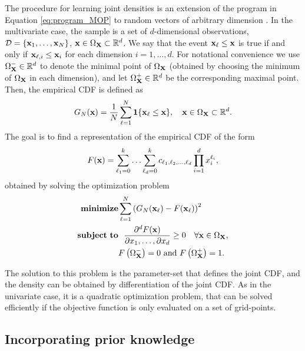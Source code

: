 The procedure for learning joint densities is an extension of the  program in Equation \ref{eq:program_MOP} to random vectors of
arbitrary dimension \citep{Per15b}. 
In the multivariate case, the sample is a set of $d$-dimensional observations, 
${\cal D}=\{ \mathbf{x}_1,\ldots,\mathbf{x}_N \}$, $\mathbf{x}\in\Omega_{\mathbf{X}}\subset\mathbb{R}^d$. 
We say that the event $\mathbf{x}_\ell \leq \mathbf{x}$ is true if and only if $\mathbf{x}_{\ell,i} \leq \mathbf{x}_i$ for each dimension $i=1,\ldots, d$.
For notational convenience we use $\Omega_{\mathbf{X}}^-\in\mathbb{R}^d$ to denote the minimal point of $\Omega_{\mathbf{X}}$ (obtained by choosing the minimum of $\Omega_{\mathbf{X}}$ in each dimension), and let $\Omega_{\mathbf{X}}^+\in\mathbb{R}^d$ be the corresponding  maximal point. Then, the empirical CDF is defined as
\begin{equation}
\nonumber
G_N(\mathbf{x}) = \frac{1}{N} \sum_{\ell=1}^N  \mathbf{1}\{ \mathbf{x}_\ell\leq \mathbf{x}\}, \quad \mathbf{x} \in  \Omega_{\mathbf{X}}\subset\mathbb{R}^d.
\end{equation}
The goal is to find a representation of the empirical CDF of the form 
$$F(\mathbf{x})=\sum_{\ell_1=0}^k \ldots \sum_{\ell_d=0}^k c_{\ell_1,\ell_2,\ldots,\ell_d} \prod_{i=1}^d x_i^{\ell_i},$$
obtained by solving the optimization problem
\begin{align}
\mathbf{minimize} & \displaystyle  \sum_{\ell=1}^N \left(G_N(\mathbf{x}_\ell) - F(\mathbf{x}_\ell)\right) ^2  \notag  \\
\mathbf{subject~to} & ~~\displaystyle \frac{\partial^d F(\mathbf{x})}
{\partial x_1, \dots, \partial x_d} \geq 0  \quad \forall \mathbf{x} \in \Omega_{\mathbf{X}},\label{eq:jointN_MOP}\\
& 
\displaystyle F\left(\Omega_{\mathbf{X}}^-\right) =0 \notag  \text{ and }    \notag  \displaystyle F\left(\Omega_{\mathbf{X}}^+\right) =1.  \notag
\end{align}


The solution to this problem is the parameter-set that defines the joint CDF, and the density can be obtained 
by differentiation of the joint CDF.  As in the univariate case, it is a quadratic optimization problem, 
that can be solved efficiently if the objective function is only evaluated on a set of grid-points.


\subsection{Incorporating prior knowledge}\label{sec:priorKnowledge}
\label{sec:incorporatingKnowledge}

